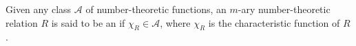 Given any class $\mathcal{A}$ of number-theoretic functions, an $m$-ary number-theoretic relation $R$ is said to be an  if $\chi_R \in \mathcal{A}$, where $\chi_R$ is the characteristic function of $R$.
